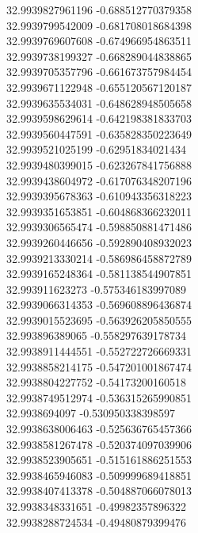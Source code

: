 {32.9939827961196	-0.688512770379358\\
32.9939799542009	-0.681708018684398\\
32.9939769607608	-0.674966954863511\\
32.9939738199327	-0.668289044838865\\
32.9939705357796	-0.661673757984454\\
32.9939671122948	-0.655120567120187\\
32.9939635534031	-0.648628948505658\\
32.9939598629614	-0.642198381833703\\
32.9939560447591	-0.635828350223649\\
32.9939521025199	-0.62951834021434\\
32.9939480399015	-0.623267841756888\\
32.9939438604972	-0.617076348207196\\
32.9939395678363	-0.610943356318223\\
32.9939351653851	-0.604868366232011\\
32.9939306565474	-0.598850881471486\\
32.9939260446656	-0.592890408932023\\
32.9939213330214	-0.586986458872789\\
32.9939165248364	-0.581138544907851\\
32.993911623273	-0.575346183997089\\
32.9939066314353	-0.569608896436874\\
32.9939015523695	-0.563926205850555\\
32.993896389065	-0.558297639178734\\
32.9938911444551	-0.552722726669331\\
32.9938858214175	-0.547201001867474\\
32.9938804227752	-0.54173200160518\\
32.9938749512974	-0.536315265990851\\
32.9938694097	-0.530950338398597\\
32.9938638006463	-0.525636765457366\\
32.9938581267478	-0.520374097039906\\
32.9938523905651	-0.515161886251553\\
32.9938465946083	-0.509999689418851\\
32.9938407413378	-0.504887066078013\\
32.9938348331651	-0.49982357896322\\
32.9938288724534	-0.49480879399476\\
}

